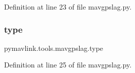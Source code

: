 Definition at line 23 of file mavgpslag.\+py.

\mbox{\label{namespacepymavlink_1_1tools_1_1mavgpslag_a1ac3c1666aa73ae9d145485df40520f3}} 
\subsubsection{\texorpdfstring{type}{type}}
{\footnotesize\ttfamily pymavlink.\+tools.\+mavgpslag.\+type}



Definition at line 25 of file mavgpslag.\+py.


